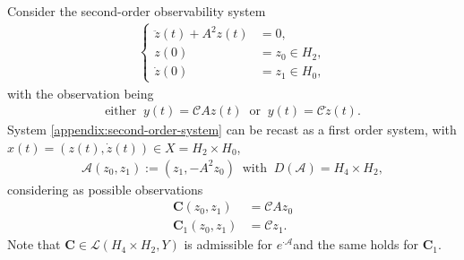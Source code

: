\documentclass[10pt]{amsart}
\theoremstyle{definition}
\let\mc\mathcal
\newcommand{\A}{\mc{A}}
\newcommand{\bC}{\boldsymbol{C}}
\begin{document}
Consider the second-order observability system
\begin{align}\label{appendix:second-order-system}
\left\{\begin{array}{rl}
\ddot{z}(t)+A^2z(t)&=0, \\[3pt]
z(0)&=z_0\in H_2,\\[3pt]
\dot{z}(0)&=z_1\in H_0,
\end{array}\right.
\end{align}
with the observation being
\begin{align*}
\text{either }\ y(t)=\mc{C}Az(t)\ \text{ or }\ y(t)=\mc{C}\dot{z}(t).
\end{align*}
System \eqref{appendix:second-order-system} can be recast as a first order system, with $x(t)=(z(t), \dot{z}(t))\in X=H_2\times H_0$,
\begin{align*}
\A(z_0, z_1):=(z_1, -A^2z_0)\ \text{ with }\ D(\A)=H_4\times H_2,
\end{align*}
considering as possible observations
\begin{equation}
\begin{aligned}
\label{defobservplate}
\bC(z_0, z_1)&=\mc{C}Az_0\\
\bC_1(z_0, z_1)&=\mc{C}z_1.
\end{aligned}
\end{equation}
Note that $\bC\in \mc{L}(H_4\times H_2, Y)$ is admissible for $e^{\cdot \A}$and the same holds for $\bC_1$.
\end{document}
